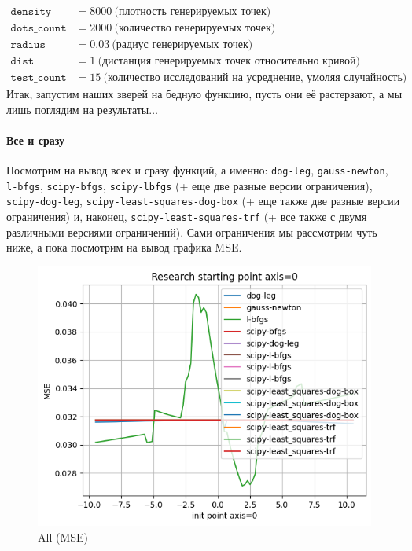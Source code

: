 \documentclass[12pt, a4paper, oneside, final]{article}
\begin{document}
	\begin{align*}
		\mathtt{density} &= 8000~\text{(плотность генерируемых точек)} \\
		\mathtt{dots\_count} &= 2000~\text{(количество генерируемых точек)} \\
		\mathtt{radius} &= 0.03~\text{(радиус генерируемых точек)} \\
		\mathtt{dist} &= 1~\text{(дистанция генерируемых точек относительно кривой)} \\
		\mathtt{test\_count} &= 15~\text{(количество исследований на усреднение, умоляя случайность)}
	\end{align*}
	Итак, запустим наших зверей на бедную функцию, пусть они её растерзают, а мы лишь поглядим на результаты$\ldots$
	\paragraph{Все и сразу}
	Посмотрим на вывод всех и сразу функций, а именно: \texttt{dog-leg}, \texttt{gauss-newton}, \texttt{l-bfgs}, \texttt{scipy-bfgs}, \texttt{scipy-lbfgs} (+ еще две разные версии ограничения), \texttt{scipy-dog-leg}, \texttt{scipy-least-squares-dog-box} (+ еще также две разные версии ограничения) и, наконец, \texttt{scipy-least-squares-trf} (+ все также с двумя различными версиями ограничений).
	Сами ограничения мы рассмотрим чуть ниже, а пока посмотрим на вывод графика MSE.
	\begin{figure}[H]
		\centering
		\includegraphics[scale = 1]{Image/T2A_LEAST_ALL_MSE.png}
		\caption*{All (MSE)}
	\end{figure}
\end{document}
